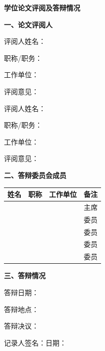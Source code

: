 
\makedefense

\begin{center}
\bfseries
学位论文评阅及答辩情况
\end{center}

\vspace{1cm}


{\bfseries 一、论文评阅人}

评阅人姓名：\hrulefill

职称/职务：\hrulefill

工作单位：\hrulefill

评阅意见：\hrulefill

\vspace{0.5cm}

评阅人姓名：\hrulefill

职称/职务：\hrulefill

工作单位：\hrulefill

评阅意见：\hrulefill

\vspace{1cm}

{\bfseries 二、答辩委员会成员}

\begin{tabular}{|c|c|c|c|}
\hline
姓名 & 职称 & 工作单位 & 备注 \\
\hline
& & & 主席 \\
\hline
& & & 委员 \\
\hline
& & & 委员 \\
\hline
& & & 委员 \\
\hline
& & & 委员 \\
\hline
\end{tabular}

\vspace{1cm}

{\bfseries 三、答辩情况}

答辩日期：\hrulefill

答辩地点：\hrulefill

答辩决议：\hrulefill

\vspace{2cm}

记录人签名：\hrulefill\quad 日期：\hrulefill
